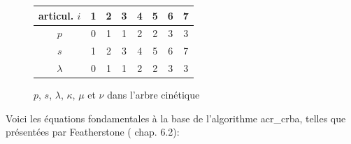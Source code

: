\documentclass{report}
\begin{document}
\begin{figure}[H]
{%
  \begin{center}
  	\end{center}
}
{%
  \begin{center}
  	\begin{tabular}{|c|c|c|c|c|c|c|c|}
  	\hline 
	articul. $i$ & 1 & 2 & 3 & 4 & 5 & 6 & 7 \\ 
  	\hline 
  	$p$ & 0 & 1 & 1 & 2 & 2 & 3 & 3 \\ 
  	\hline 
  	$s$ & 1 & 2 & 3 & 4 & 5 & 6 & 7 \\ 
  	\hline 
  	$\lambda$ & 0 & 1 & 1 & 2 & 2 & 3 & 3 \\ 
  	\hline 
  	\end{tabular} 
  \end{center}
}{}
\caption{$p$, $s$, $\lambda$, $\kappa$, $\mu$ et $\nu$ dans l'arbre cinétique}
\label{fig_chdaArbreK_p_s_k_mu_nu}
\end{figure}

Voici les équations fondamentales à la base de l'algorithme \gls{acr_crba}, telles que présentées par Featherstone (\cite{bib_featherstone} chap. 6.2):

{%
}
{%
}{}
\end{document}
